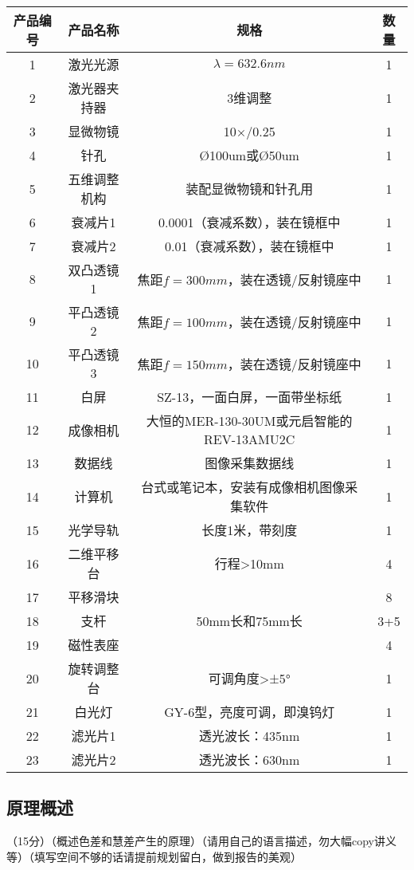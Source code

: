 \documentclass[dvipsnames, svgnames,a4paper,11pt]{article}
\begin{document}
\begin{table}[htbp]
    \centering
    \begin{tabular}{|c|c|c|c|}
        \hline
        产品编号 & 产品名称 & 规格 & 数量 \\
        \hline
        1 & 激光光源 & $\lambda =632.6nm$ & 1 \\
        2 & 激光器夹持器 & 3维调整 & 1 \\
        3 & 显微物镜 & 10×/0.25 & 1 \\
        4 & 针孔 & Ø100um或Ø50um & 1 \\
        5 & 五维调整机构 & 装配显微物镜和针孔用 & 1 \\
        6 & 衰减片1 & 0.0001（衰减系数），装在镜框中 & 1 \\
        7 & 衰减片2 & 0.01（衰减系数），装在镜框中 & 1 \\
        8 & 双凸透镜1 & 焦距$f=300mm$，装在透镜/反射镜座中 & 1 \\
        9 & 平凸透镜2 & 焦距$f=100mm$，装在透镜/反射镜座中 & 1 \\
        10 & 平凸透镜3 & 焦距$f=150mm$，装在透镜/反射镜座中 & 1 \\
        11 & 白屏 & SZ-13，一面白屏，一面带坐标纸 & 1 \\
        12 & 成像相机 & 大恒的MER-130-30UM或元启智能的REV-13AMU2C & 1 \\
        13 & 数据线 & 图像采集数据线 & 1 \\
        14 & 计算机 & 台式或笔记本，安装有成像相机图像采集软件 & 1 \\
        15 & 光学导轨 & 长度1米，带刻度 & 1 \\
        16 & 二维平移台 & 行程>10mm & 4 \\
        17 & 平移滑块 & & 8 \\
        18 & 支杆 & 50mm长和75mm长 & 3+5 \\
        19 & 磁性表座 & & 4 \\
        20 & 旋转调整台 & 可调角度>±5° & 1 \\
        21 & 白光灯 & GY-6型，亮度可调，即溴钨灯 & 1 \\
        22 & 滤光片1 & 透光波长：435nm & 1 \\
        23 & 滤光片2 & 透光波长：630nm & 1 \\
        \hline
    \end{tabular}
\end{table}



\subsection{原理概述}
（15分）（概述色差和慧差产生的原理）（请用自己的语言描述，勿大幅copy讲义等）（填写空间不够的话请提前规划留白，做到报告的美观）
\end{document}
